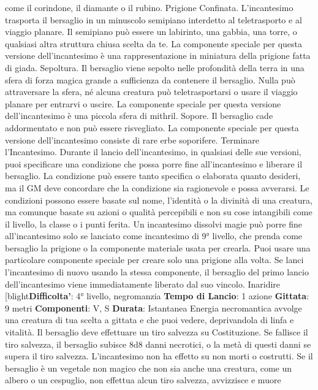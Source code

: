 \begin{multicols}{2}
come il corindone, il diamante o il rubino.
Prigione Confinata. L’incantesimo trasporta il
bersaglio in un minuscolo semipiano interdetto al
teletrasporto e al viaggio planare. Il semipiano può
essere un labirinto, una gabbia, una torre, o qualsiasi
altra struttura chiusa scelta da te.
La componente speciale per questa versione
dell’incantesimo è una rappresentazione in miniatura
della prigione fatta di giada.
Sepoltura. Il bersaglio viene sepolto nelle profondità
della terra in una sfera di forza magica grande a
sufficienza da
contenere il bersaglio. Nulla può attraversare la sfera,
né alcuna creatura può teletrasportarsi o usare il
viaggio planare per entrarvi o uscire.
La componente speciale per questa versione
dell’incantesimo è una piccola sfera di mithril.
Sopore. Il bersaglio cade addormentato e non può
essere risvegliato. La componente speciale per questa
versione dell’incantesimo consiste di rare erbe
soporifere.
Terminare l’Incantesimo. Durante il lancio
dell’incantesimo, in qualsiasi delle sue versioni, puoi
specificare una condizione che possa porre fine
all’incantesimo e liberare il bersaglio. La condizione può
essere tanto specifica o elaborata quanto desideri, ma il
GM deve concordare che la condizione sia ragionevole
e possa avverarsi. Le condizioni possono essere
basate sul nome, l’identità o la divinità di una creatura,
ma comunque basate su azioni o qualità percepibili e
non su cose intangibili come il livello, la classe o i punti
ferita.
Un incantesimo dissolvi magie può porre fine
all’incantesimo solo se lanciato come incantesimo di 9°
livello, che prenda come bersaglio la prigione o la
componente materiale usata per crearla.
Puoi usare una particolare componente speciale per
creare solo una prigione alla volta. Se lanci
l’incantesimo di nuovo usando la stessa componente, il
bersaglio del primo lancio dell’incantesimo viene
immediatamente liberato dal suo vincolo.
Inaridire
[blight\textbf{Difficolta'}:
4° livello, negromanzia
\textbf{Tempo di Lancio}: 1 azione
\textbf{Gittata}: 9 metri
\textbf{Componenti}: V, S
\textbf{Durata}: Istantanea
Energia necromantica avvolge una creatura di tua
scelta a gittata e che puoi vedere, deprivandola di linfa
e vitalità. Il bersaglio deve effettuare un tiro salvezza su
Costituzione. Se fallisce il tiro salvezza, il bersaglio
subisce 8d8 danni necrotici, o la metà di questi danni se
supera il tiro salvezza. L’incantesimo non ha effetto su
non morti o costrutti.
Se il bersaglio è un vegetale non magico che non sia
anche una creatura, come un albero o un cespuglio,
non effettua alcun tiro salvezza, avvizzisce e muore

\end{multicols}
